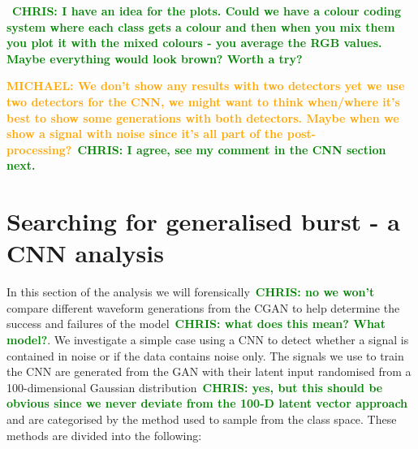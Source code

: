 \documentclass[12pt]{iopart}
\newcommand{\chris}[1]{\textbf{\textcolor{green}{CHRIS: #1}}}
\newcommand{\michael}[1]{\textbf{\textcolor{orange}{MICHAEL: #1}}}
\begin{document}
~\chris{I have an idea for the plots. Could we have a colour coding system
where each class gets a colour and then when you mix them you plot it with the
mixed colours - you average the RGB values. Maybe everything would look brown?
Worth a try?}

%

\michael{We don't show any results with two detectors yet we use two detectors
for the CNN, we might want to think when/where it's best to show some
generations with both detectors. Maybe when we show a signal with noise since
it's all part of the post-processing?}~\chris{I agree, see my comment in the
CNN section next.}

\section{Searching for generalised burst - a CNN analysis}

In this section of the analysis we will forensically~\chris{no we won't}
compare different waveform generations from the \ac{CGAN} to help determine the
success and failures of the model~\chris{what does this mean? What model?}. We
investigate a simple case using a \ac{CNN} to detect whether a signal is
contained in noise or if the data contains noise only. The signals we use to
train the \ac{CNN} are generated from the \ac{GAN} with their latent input
randomised from a 100-dimensional Gaussian distribution~\chris{yes, but this
should be obvious since we never deviate from the 100-D latent vector approach}
and are categorised by the method used to sample from the class space. These
methods are divided into the following: 
\end{document}
